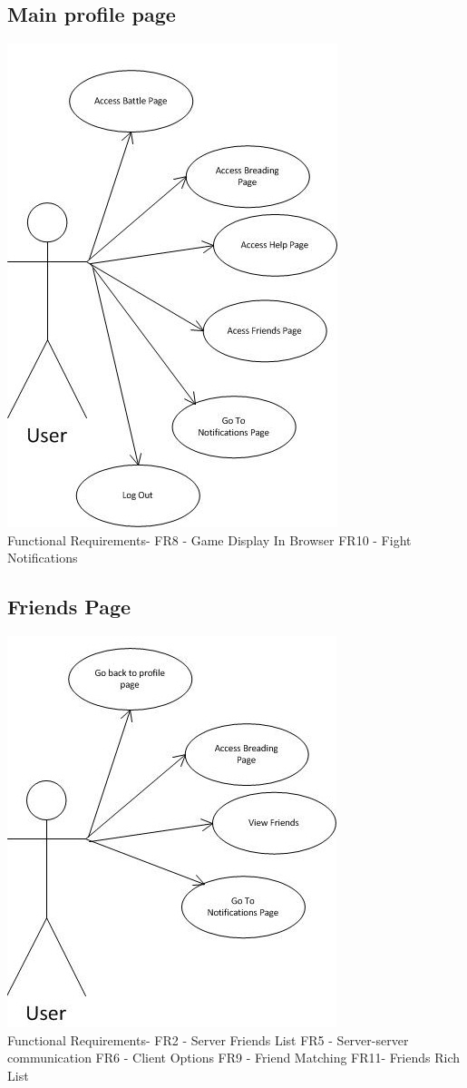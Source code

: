 \documentclass{project}
\begin{document}
\newpage
\subsection{Main profile page}
\includegraphics[scale=0.6]{MainProfilePageUseCase.jpg}
\\
Functional Requirements-
FR8 - Game Display In Browser
FR10 - Fight Notifications

\newpage
\subsection{Friends Page}
\includegraphics[scale=0.6]{FriendsPageUseCase.jpg}
\\
Functional Requirements-
FR2 - Server Friends List
FR5 - Server-server communication
FR6 - Client Options
FR9 - Friend Matching
FR11- Friends Rich List
\end{document}
